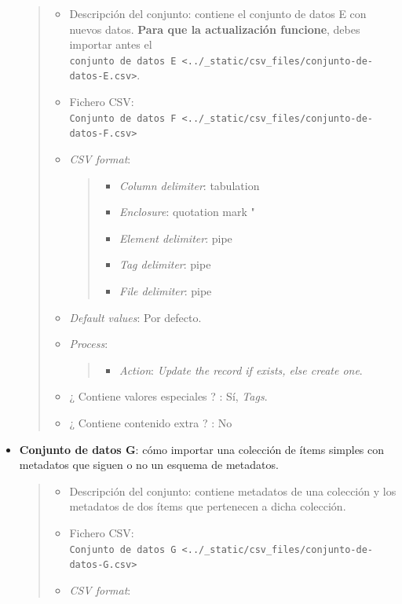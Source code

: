 \documentclass[
]{article}
\providecommand{\tightlist}{%
  \setlength{\itemsep}{0pt}\setlength{\parskip}{0pt}}
\begin{document}
\begin{itemize}
  \begin{quote}
  \begin{itemize}
  \item
    Descripción del conjunto: contiene el conjunto de datos E con nuevos
    datos. \textbf{Para que la actualización funcione}, debes importar
    antes el
    \texttt{conjunto\ de\ datos\ E\ \textless{}../\_static/csv\_files/conjunto-de-datos-E.csv\textgreater{}}.
  \item
    Fichero CSV:
    \texttt{Conjunto\ de\ datos\ F\ \textless{}../\_static/csv\_files/conjunto-de-datos-F.csv\textgreater{}}
  \item
    \emph{CSV format}:

    \begin{quote}
    \begin{itemize}
    \tightlist
    \item
      \emph{Column delimiter}: tabulation
    \item
      \emph{Enclosure}: quotation mark "
    \item
      \emph{Element delimiter}: pipe
    \item
      \emph{Tag delimiter}: pipe
    \item
      \emph{File delimiter}: pipe
    \end{itemize}
    \end{quote}
  \item
    \emph{Default values}: Por defecto.
  \item
    \emph{Process}:

    \begin{quote}
    \begin{itemize}
    \tightlist
    \item
      \emph{Action}: \emph{Update the record if exists, else create
      one}.
    \end{itemize}
    \end{quote}
  \item
    ¿ Contiene valores especiales ? : Sí, \emph{Tags}.
  \item
    ¿ Contiene contenido extra ? : No
  \end{itemize}
  \end{quote}
\item
  \textbf{Conjunto de datos G}: cómo importar una colección de ítems
  simples con metadatos que siguen o no un esquema de metadatos.

  \begin{quote}
  \begin{itemize}
  \item
    Descripción del conjunto: contiene metadatos de una colección y los
    metadatos de dos ítems que pertenecen a dicha colección.
  \item
    Fichero CSV:
    \texttt{Conjunto\ de\ datos\ G\ \textless{}../\_static/csv\_files/conjunto-de-datos-G.csv\textgreater{}}
  \item
    \emph{CSV format}:


\end{itemize}
\end{quote}
\end{itemize}
\end{document}
